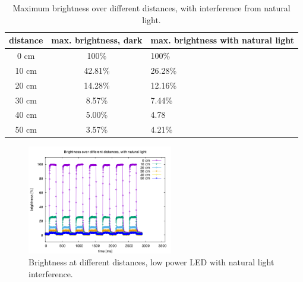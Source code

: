 \begin{table}[hbt]
\centering
  \begin{tabular}{c c l}
    distance & max. brightness, dark & max. brightness with natural light \\
    \hline
    0 cm & 100\% & 100\%\\
    10 cm & 42.81\% & 26.28\%\\
    20 cm & 14.28\% & 12.16\%\\
    30 cm & 8.57\% & 7.44\%\\
    40 cm & 5.00\% & 4.78\\
    50 cm & 3.57\% & 4.21\%\\
  \end{tabular}
 \caption{Maximum brightness over different distances, with interference from natural light.}
  \label{tab:distancesphyINT}
\end{table}

\begin{figure}[hbt]
\centering
  \includegraphics[height=180px]{img/distancephyINT}
  \caption{Brightness at different distances, low power LED with natural light interference.}
  \label{fig:distanchephyINT}
\end{figure}


